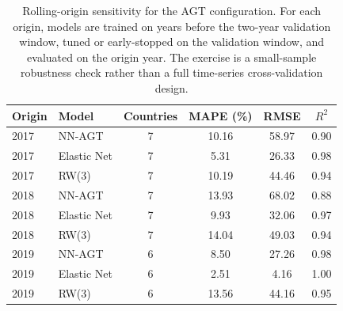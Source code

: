 \begin{table}[!htb]
\centering
\caption{Rolling-origin sensitivity for the AGT configuration. For each origin, models are trained on years before the two-year validation window, tuned or early-stopped on the validation window, and evaluated on the origin year. The exercise is a small-sample robustness check rather than a full time-series cross-validation design.}
\label{tab:rolling_origin_sensitivity}
\begin{tabular}{l l c c c c}
\toprule
Origin & Model & Countries & MAPE (\%) & RMSE & $R^2$ \\
\midrule
2017 & NN-AGT & 7 & 10.16 & 58.97 & 0.90 \\
2017 & Elastic Net & 7 & 5.31 & 26.33 & 0.98 \\
2017 & RW(3) & 7 & 10.19 & 44.46 & 0.94 \\
2018 & NN-AGT & 7 & 13.93 & 68.02 & 0.88 \\
2018 & Elastic Net & 7 & 9.93 & 32.06 & 0.97 \\
2018 & RW(3) & 7 & 14.04 & 49.03 & 0.94 \\
2019 & NN-AGT & 6 & 8.50 & 27.26 & 0.98 \\
2019 & Elastic Net & 6 & 2.51 & 4.16 & 1.00 \\
2019 & RW(3) & 6 & 13.56 & 44.16 & 0.95 \\
\bottomrule
\end{tabular}
\end{table}
